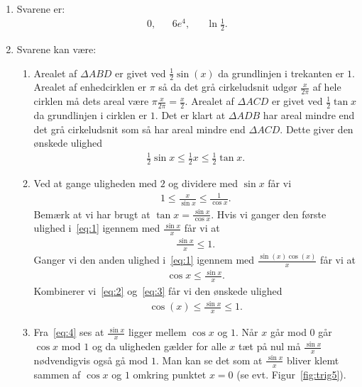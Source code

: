 \begin{enumerate}
	\item Svarene er:
	\begin{align*}
	0,&& 6e^4,&&  \ln \frac{1}{2}.
	\end{align*}
	
	\item\label{it:lim1} Svarene kan være:
	\begin{enumerate}
		\item Arealet af $\Delta ABD$ er givet ved $\frac{1}{2}\sin(x)$ da grundlinjen i trekanten er $1$. Arealet af enhedcirklen er $\pi$ så da det grå cirkeludsnit udgør $ \frac{x}{2\pi} $ af hele cirklen må dets areal være $ \pi\frac{x}{2\pi}=\frac{x}{2} $. Arealet af $\Delta ACD$ er givet ved $\frac{1}{2}\tan x$ da grundlinjen i cirklen er $1$. Det er klart at $\Delta ADB$ har areal mindre end det grå cirkeludsnit som så har areal mindre end $\Delta ACD$. Dette giver den ønskede ulighed
		\begin{align*}
		\frac{1}{2}\sin x\leq \frac{1}{2}x\leq \frac{1}{2}\tan x.
		\end{align*}
		
		\item Ved at gange uligheden med $2$ og dividere med $\sin x$ får vi
		\begin{align}\label{eq:1}
		1\leq \frac{x}{\sin x}\leq \frac{1}{\cos x}.
		\end{align}
		Bemærk at vi har brugt at $\tan x=\frac{\sin x}{\cos x}$. Hvis vi ganger den første ulighed i~\eqref{eq:1} igennem med $\frac{\sin x}{x}$ får vi at
		\begin{align}\label{eq:2}
		\frac{\sin x}{x}\leq 1.
		\end{align}
		Ganger vi den anden ulighed i~\eqref{eq:1} igennem med $\frac{\sin(x)\cos(x)}{x}$ får vi at 
		\begin{align}\label{eq:3}
		\cos x\leq \frac{\sin x}{x}.
		\end{align}
		Kombinerer vi~\eqref{eq:2} og~\eqref{eq:3} får vi den ønskede ulighed
		\begin{align}\label{eq:4}
		\cos(x)\leq \frac{\sin x}{x}\leq 1.
		\end{align}

		
		\item Fra~\eqref{eq:4} ses at $ \frac{\sin x}{x} $ ligger mellem $\cos x$ og $1$. Når $x$ går mod $0$ går $\cos x$ mod $1$ og da uligheden gælder for alle $x$ tæt på nul må $\frac{\sin x}{x}$ nødvendigvis også gå mod $1$. Man kan se det som at $\frac{\sin x}{x}$ bliver klemt sammen af $\cos x$ og $1$ omkring punktet $x=0$ (se evt. Figur~\ref{fig:trig5}).
	\end{enumerate}


\end{enumerate}
